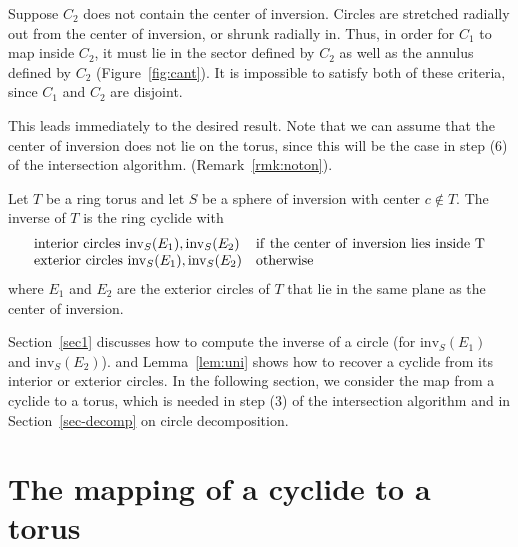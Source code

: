 Suppose $C_2$ does not contain the center of inversion.
Circles are stretched radially out from the center of inversion,
or shrunk radially in.
Thus, in order for $C_1$ to map inside $C_2$, it must lie in the sector
defined by $C_2$ as well as the annulus defined by $C_2$ 
(Figure~\ref{fig:cant}).
It is impossible to satisfy both of these criteria,
since $C_1$ and $C_2$ are disjoint.
\QED


This leads immediately to the desired result.
Note that we can assume that the center of inversion does not lie on the torus,
since this will be the case in step (6) of the intersection algorithm.
(Remark~\ref{rmk:noton}).

\ifFull
\else
\newpage
\fi

\begin{theorem}
\label{thm:invtorus}
Let $T$ be a ring torus and let
$S$ be a sphere of inversion with center $c \not \in T$.
The inverse of $T$ is the ring cyclide with 
\[ \begin{array}{ll}
   {\rm interior\ circles\ } \mbox{inv}_S(E_1), \mbox{inv}_S(E_2) &
		\rm{if\ the\ center\ of\ inversion\ lies\ inside\ } T \\
   {\rm exterior\ circles\ } \mbox{inv}_S(E_1), \mbox{inv}_S(E_2) &
			\rm{otherwise}
   \end{array}
\]
where $E_1$ and $E_2$ are the exterior circles of $T$
that lie in the same plane as the center of inversion.
\end{theorem}

Section~\ref{sec1} discusses how to compute the inverse of a circle
(for $\mbox{inv}_S(E_1)$ and $\mbox{inv}_S(E_2)$).
and Lemma~\ref{lem:uni} shows how to recover a cyclide from its interior or
exterior circles.
In the following section, 
we consider the map from a cyclide to a torus, which
is needed in step (3) of the intersection algorithm and in 
Section~\ref{sec-decomp} on circle decomposition.


% 

\section{The mapping of a cyclide to a torus}
\label{sec:totorus}

